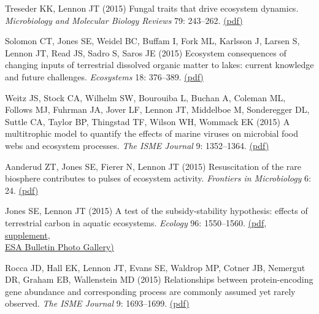 \documentclass[11pt]{article}
\begin{document}
\begin{etaremune}
\item Treseder KK, Lennon JT (2015) Fungal traits that drive ecosystem dynamics. \textit{Microbiology and Molecular Biology Reviews} 79: 243–262. \href{https://lennonlab.github.io/assets/publications/Treseder_Lennon_2015.pdf}{(pdf)}

\item Solomon CT, Jones SE, Weidel BC, Buffam I, Fork ML, Karlsson J, Larsen S, Lennon JT, Read JS, Sadro S, Saros JE (2015) Ecosystem consequences of changing inputs of terrestrial dissolved organic matter to lakes: current knowledge and future challenges. \textit{Ecosystems} 18: 376–389. \href{https://lennonlab.github.io/assets/publications/Solomon_etal_2015.pdf}{(pdf)}

\item Weitz JS, Stock CA, Wilhelm SW, Bourouiba L, Buchan A, Coleman ML, Follows MJ, Fuhrman JA, Jover LF, Lennon JT, Middelboe M, Sonderegger DL, Suttle CA, Taylor BP, Thingstad TF, Wilson WH, Wommack EK (2015) A multitrophic model to quantify the effects of marine viruses on microbial food webs and ecosystem processes. \textit{The ISME Journal} 9: 1352–1364. \href{https://lennonlab.github.io/assets/publications/Weitz_etal_2015.pdf}{(pdf)}

\item Aanderud ZT, Jones SE, Fierer N, Lennon JT (2015) Resuscitation of the rare biosphere contributes to pulses of ecosystem activity. \textit{Frontiers in Microbiology} 6: 24. \href{https://lennonlab.github.io/assets/publications/Aanderud_etal_2015.pdf}{(pdf)}

\item Jones SE, Lennon JT (2015) A test of the subsidy-stability hypothesis: effects of terrestrial carbon in aquatic ecosystems. \textit{Ecology} 96: 1550–1560. \href{https://lennonlab.github.io/assets/publications/Jones_Lennon_2015.pdf}{(pdf}, \href{https://esapubs.org/archive/ecol/E096/138/}{supplement}, \\ \href{https://lennonlab.github.io/assets/publications/Jones_Lennon_2016_ESABulletin.pdf}{ESA Bulletin Photo Gallery)}

\item Rocca JD, Hall EK, Lennon JT, Evans SE, Waldrop MP, Cotner JB, Nemergut DR, Graham EB, Wallenstein MD (2015) Relationships between protein-encoding gene abundance and corresponding process are commonly assumed yet rarely observed. \textit{The ISME Journal} 9: 1693–1699. \href{https://lennonlab.github.io/assets/publications/Rocca_etal_2015.pdf}{(pdf)}


\end{etaremune}
\end{document}
